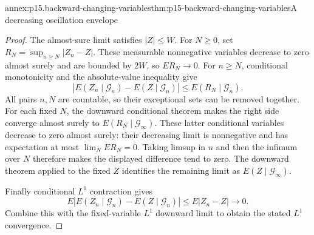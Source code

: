 \begin{annexitem}{annex:p15.backward-changing-variables}{thm:p15-backward-changing-variables}{A decreasing oscillation envelope}
\begin{proof}
The almost-sure limit satisfies \(|Z|\leq W\).
For \(N\geq0\), set
\(R_N=\sup_{n\geq N}|Z_n-Z|\).
These measurable nonnegative variables decrease to zero almost surely
and are bounded by \(2W\), so \(ER_N\to0\).
For \(n\geq N\), conditional monotonicity and the absolute-value
inequality give
\[
 |E(Z_n\mid\mathcal G_n)-E(Z\mid\mathcal G_n)|
                              \leq E(R_N\mid\mathcal G_n).
\]
All pairs \(n,N\) are countable, so their exceptional sets can be
removed together.
For each fixed \(N\), the downward conditional theorem makes the
right side converge almost surely to \(E(R_N\mid\mathcal G_\infty)\).
These latter conditional variables decrease to zero almost surely:
their decreasing limit is nonnegative and has expectation at most
\(\lim_NER_N=0\).
Taking limsup in \(n\) and then the infimum over \(N\) therefore
makes the displayed difference tend to zero.
The downward theorem applied to the fixed \(Z\) identifies the
remaining limit as \(E(Z\mid\mathcal G_\infty)\).

Finally conditional \(L^1\) contraction gives
\[
 E|E(Z_n\mid\mathcal G_n)-E(Z\mid\mathcal G_n)|
                                      \leq E|Z_n-Z|\longrightarrow0.
\]
Combine this with the fixed-variable \(L^1\) downward limit to
obtain the stated \(L^1\) convergence.
\end{proof}
\end{annexitem}

